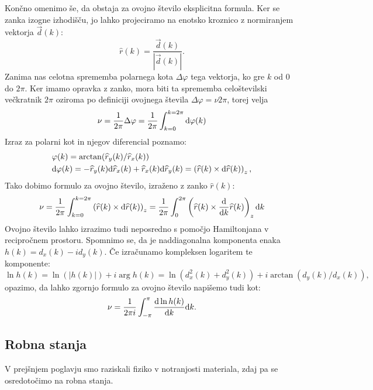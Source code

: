 Končno omenimo še, da obstaja za ovojno število eksplicitna formula.
Ker se zanka izogne izhodišču, jo lahko projeciramo na enotsko kroznico z normiranjem vektorja $\vec{d}(k)$:
\begin{equation}
\widehat{r}(k) = \frac{\vec{d}(k)}{|\vec{d}(k)|}.
\end{equation}
Zanima nas celotna sprememba polarnega kota $\Delta \varphi$ tega vektorja, ko gre $k$ od $0$ do $2 \pi$. Ker imamo opravka z zanko, mora biti ta sprememba celoštevilski večkratnik $2 \pi$ oziroma po definiciji ovojnega števila $\Delta \varphi = \nu 2 \pi$, torej velja
\begin{equation}
\nu = \frac{1}{2  \pi} \Delta \varphi = \frac{1}{2 \pi} \int_{k=0}^{k=2 \pi} \textup{d}\varphi(k)
\end{equation}
Izraz za polarni kot in njegov diferencial poznamo:
\begin{align}
&\varphi(k) = \arctan (\widehat{r}_y(k) / \widehat{r}_x(k)) \\
&\textup{d} \varphi(k) = - \widehat{r}_y(k) \textup{d} \widehat{r}_x(k) +  \widehat{r}_x(k) \textup{d} \widehat{r}_y(k) = \left( \widehat{r}(k) \times \textup{d} \widehat{r}(k) \right)_z,
\end{align}
Tako dobimo formulo za ovojno število, izraženo z zanko $\widehat{r}(k)$:
\begin{equation}
\nu = \frac{1}{2 \pi} \int_{k=0}^{k=2 \pi}  \left( \widehat{r}(k) \times \textup{d} \widehat{r}(k) \right)_z = \frac{1}{2 \pi} \int_0^{2 \pi} \left ( \widehat{r}(k) \times \frac{\textup{d}}{\textup{d} k} \widehat{r}(k) \right)_z \textup{d}k
\end{equation}
Ovojno število lahko izrazimo tudi neposredno s pomočjo Hamiltonjana v recipročnem prostoru. Spomnimo se, da je naddiagonalna komponenta enaka
$h(k) = d_x (k) - i d_y(k)$. Če izračunamo kompleksen logaritem te komponente:
\begin{equation}
\ln h(k) = \ln (|h(k)|) + i \arg h(k) = \ln(d_x^2(k) + d_y^2(k)) + i \arctan (d_y(k) / d_x(k)),
\end{equation}
opazimo, da lahko zgornjo formulo za ovojno število napišemo tudi kot:
\begin{equation}
\nu = \frac{1}{2 \pi i} \int_{- \pi}^\pi \frac{\textup{d}  \ln h(k) }{\textup{d} k}\textup{d}k.
\end{equation}
\subsection{Robna stanja}
V prejšnjem poglavju smo raziskali fiziko v notranjosti materiala, zdaj pa se osredotočimo na robna stanja. 

